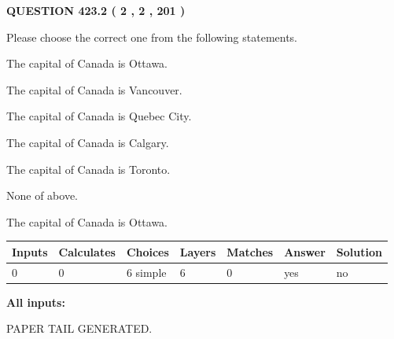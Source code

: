 \documentclass[12pt]{article}
\begin{document}
\vspace{0.2in}
  
{\textbf{\Large{QUESTION
423.2 
 ( 2 , 2 , 201 )
}}}
  
  
Please choose the correct one from the following statements.
 
 
The capital of Canada is Ottawa.
 
 
The capital of Canada is Vancouver.
 
 
The capital of Canada is Quebec City.
 
 
The capital of Canada is Calgary.
 
 
The capital of Canada is Toronto.
 
 
 None of above.
 
 
\noindent{}
 
 
The capital of Canada is Ottawa.
 
 
\noindent{}
 
 
   
   
   
   
\noindent\begin{tabular}{|l|l|l|l|l|l|l|}
 \hline
Inputs & Calculates & Choices & Layers & Matches & Answer & Solution \\ \hline
 0  & 
 0  & 
 6
  simple  
  & 
 6  & 
 0  & 
  yes & 
  no 
  \\ \hline
 \end{tabular}
   
   
   
   
\noindent{}
   
   
   
   
\noindent\vspace{0.1in}\hspace{-0.08in} {\textbf{\Large{All inputs: }}}
   
   
   
   
   
   
 \vspace{0.2in}
 
   
   
\vspace{2.0in} PAPER TAIL GENERATED.
   
\end{document}
